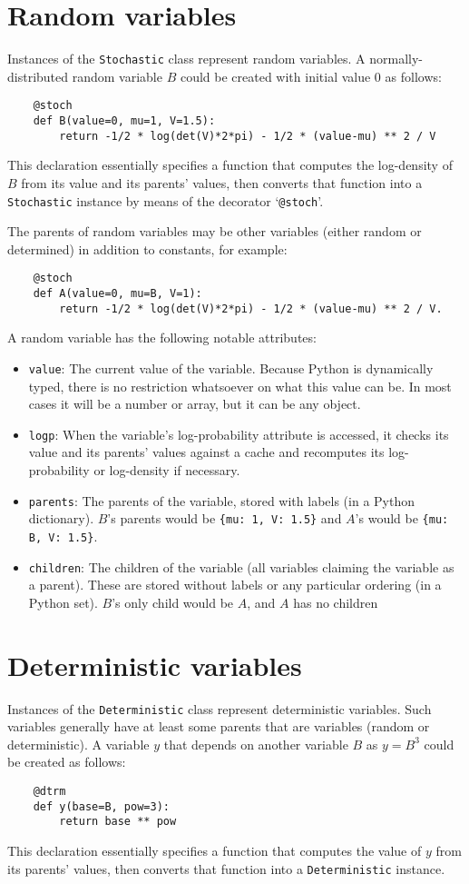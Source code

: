 \documentclass{report}
\begin{document}
\section{Random variables}
Instances of the \texttt{Stochastic} class represent random variables. A normally-distributed random variable $B$ could be created with initial value 0 as follows:
\begin{verbatim}
    @stoch
    def B(value=0, mu=1, V=1.5):
        return -1/2 * log(det(V)*2*pi) - 1/2 * (value-mu) ** 2 / V
\end{verbatim}
This declaration essentially specifies a function that computes the log-density of $B$ from its value and its parents' values, then converts that function into a \texttt{Stochastic} instance by means of the decorator `\texttt{@stoch}'.

The parents of random variables may be other variables (either random or determined) in addition to constants, for example:
\begin{verbatim}
    @stoch
    def A(value=0, mu=B, V=1):
        return -1/2 * log(det(V)*2*pi) - 1/2 * (value-mu) ** 2 / V.
\end{verbatim}


A random variable has the following notable attributes:
\begin{itemize}
    \item \texttt{value}: The current value of the variable. Because Python is dynamically typed, there is no restriction whatsoever on what this value can be. In most cases it will be a number or array, but it can be any object.
    \item \texttt{logp}: When the variable's log-probability attribute is accessed, it checks its value and its parents' values against a cache and recomputes its log-probability or log-density if necessary.
    \item \texttt{parents}: The parents of the variable, stored with labels (in a Python dictionary). $B$'s parents would be \texttt{\{mu: 1, V: 1.5\}} and $A$'s would be \texttt{\{mu: B, V: 1.5\}}.
    \item \texttt{children}: The children of the variable (all variables claiming the variable as a parent). These are stored without labels or any particular ordering (in a Python set). $B$'s only child would be $A$, and $A$ has no children
\end{itemize}


\section{Deterministic variables}
Instances of the \texttt{Deterministic} class represent deterministic variables. Such variables generally have at least some parents that are variables (random or deterministic). A variable $y$ that depends on another variable $B$ as $y=B^3$ could be created as follows:
\begin{verbatim}
    @dtrm
    def y(base=B, pow=3):
        return base ** pow
\end{verbatim}
This declaration essentially specifies a function that computes the value of $y$ from its parents' values, then converts that function into a \texttt{Deterministic} instance.
\end{document}

